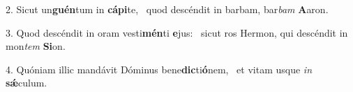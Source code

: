 2. Sicut un\textbf{guén}tum in \textbf{cá}\textbf{pi}te, \ast\  quod descéndit in barbam, bar\textit{bam} \textbf{A}aron.\

3. Quod descéndit in oram vesti\textbf{mén}ti \textbf{e}jus: \ast\  sicut ros Hermon, qui descéndit in mon\textit{tem} \textbf{Si}on.\

4. Quóniam illic mandávit Dóminus bene\textbf{dic}ti\textbf{ó}nem, \ast\  et vitam usque \textit{in} \textbf{sǽ}culum.\

